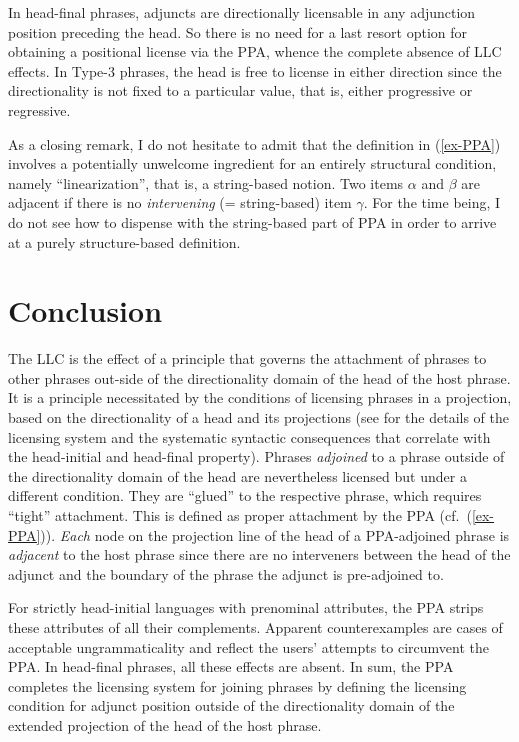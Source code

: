 \documentclass[output=paper
  ,nobabel
  ,uniformtopskip %
]{langscibook}
\begin{document}
In head-final phrases, adjuncts are directionally licensable in any adjunction position preceding the head. So there is no need for a last resort option for obtaining a positional license via the PPA, whence the complete absence of LLC effects. In Type-3 phrases, the head is free to license in either direction since the directionality is not fixed to a particular value, that is, either progressive or regressive.

As a closing remark, I do not hesitate to admit that the definition in (\ref{ex-PPA}) involves a potentially unwelcome ingredient for an entirely structural condition, namely ``linearization'', that is, a string-based notion. Two items $\alpha$ and $\beta$ are adjacent if there is no \emph{intervening} (= string-based) item $\gamma$. For the time being, I do not see how to dispense with the string-based part of PPA in order to arrive at a purely structure-based definition.

\section{Conclusion}\label{sec-con-hai}

\largerpage
The LLC is the effect of a principle that governs the attachment of phrases to other phrases out-side of the directionality domain of the head of the host phrase. It is a principle necessitated by the conditions of licensing phrases in a projection, based on the directionality of a head and its projections (see \citealp{Haider2015} for the details of the licensing system and the systematic syntactic consequences that correlate with the head-initial and head-final property). Phrases \emph{adjoined} to a phrase outside of the directionality domain of the head are nevertheless licensed but under a different condition. They are ``glued'' to the respective phrase, which requires ``tight'' attachment. This is defined as proper attachment by the PPA (cf.\ (\ref{ex-PPA})). \emph{Each} node on the projection line of the head of a PPA-adjoined phrase is \emph{adjacent} to the host phrase since there are no interveners between the head of the adjunct and the boundary of the phrase the adjunct is pre-adjoined to.

For strictly head-initial languages with prenominal attributes, the PPA strips these attributes of all their complements. Apparent counterexamples are cases of acceptable ungrammaticality and reflect the users' attempts to circumvent the PPA. In head-final phrases, all these effects are absent. In sum, the PPA completes the licensing system for joining phrases by defining the licensing condition for adjunct position outside of the directionality domain of the extended projection of the head of the host phrase.
\end{document}
